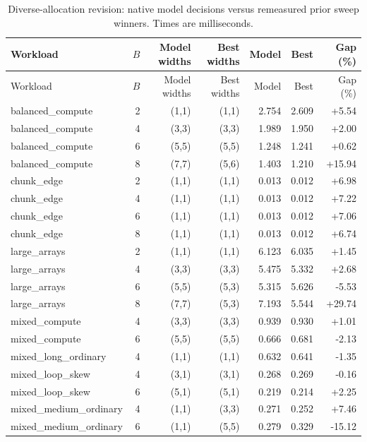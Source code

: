 \begin{center}
\small
\begin{longtable}{lrrrrrr}
\caption{Diverse-allocation revision: native model decisions versus remeasured prior sweep winners. Times are milliseconds.}\label{tab:utb-diverse-validation}\\
\toprule
Workload & $B$ & Model widths & Best widths & Model & Best & Gap (\%) \\
\midrule
\endfirsthead
\toprule
Workload & $B$ & Model widths & Best widths & Model & Best & Gap (\%) \\
\midrule
\endhead
\bottomrule\endfoot
balanced\_compute & 2 & (1,1) & (1,1) & 2.754 & 2.609 & +5.54 \\
balanced\_compute & 4 & (3,3) & (3,3) & 1.989 & 1.950 & +2.00 \\
balanced\_compute & 6 & (5,5) & (5,5) & 1.248 & 1.241 & +0.62 \\
balanced\_compute & 8 & (7,7) & (5,6) & 1.403 & 1.210 & +15.94 \\
chunk\_edge & 2 & (1,1) & (1,1) & 0.013 & 0.012 & +6.98 \\
chunk\_edge & 4 & (1,1) & (1,1) & 0.013 & 0.012 & +7.22 \\
chunk\_edge & 6 & (1,1) & (1,1) & 0.013 & 0.012 & +7.06 \\
chunk\_edge & 8 & (1,1) & (1,1) & 0.013 & 0.012 & +6.74 \\
large\_arrays & 2 & (1,1) & (1,1) & 6.123 & 6.035 & +1.45 \\
large\_arrays & 4 & (3,3) & (3,3) & 5.475 & 5.332 & +2.68 \\
large\_arrays & 6 & (5,5) & (5,3) & 5.315 & 5.626 & -5.53 \\
large\_arrays & 8 & (7,7) & (5,3) & 7.193 & 5.544 & +29.74 \\
mixed\_compute & 4 & (3,3) & (3,3) & 0.939 & 0.930 & +1.01 \\
mixed\_compute & 6 & (5,5) & (5,5) & 0.666 & 0.681 & -2.13 \\
mixed\_long\_ordinary & 4 & (1,1) & (1,1) & 0.632 & 0.641 & -1.35 \\
mixed\_loop\_skew & 4 & (3,1) & (3,1) & 0.268 & 0.269 & -0.16 \\
mixed\_loop\_skew & 6 & (5,1) & (5,1) & 0.219 & 0.214 & +2.25 \\
mixed\_medium\_ordinary & 4 & (1,1) & (3,3) & 0.271 & 0.252 & +7.46 \\
mixed\_medium\_ordinary & 6 & (1,1) & (5,5) & 0.279 & 0.329 & -15.12 \\

\end{longtable}
\end{center}
